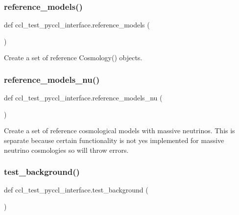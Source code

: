 \subsubsection{\texorpdfstring{reference\+\_\+models()}{reference\_models()}}
{\footnotesize\ttfamily def ccl\+\_\+test\+\_\+pyccl\+\_\+interface.\+reference\+\_\+models (\begin{DoxyParamCaption}{ }\end{DoxyParamCaption})}

\begin{DoxyVerb}Create a set of reference Cosmology() objects.
\end{DoxyVerb}
 \mbox{\label{namespaceccl__test__pyccl__interface_a2d1bcf258dbc29d3e39ce74e3dff711e}} 
\subsubsection{\texorpdfstring{reference\+\_\+models\+\_\+nu()}{reference\_models\_nu()}}
{\footnotesize\ttfamily def ccl\+\_\+test\+\_\+pyccl\+\_\+interface.\+reference\+\_\+models\+\_\+nu (\begin{DoxyParamCaption}{ }\end{DoxyParamCaption})}

\begin{DoxyVerb}Create a set of reference cosmological models with massive neutrinos.
This is separate because certain functionality is not yes implemented
for massive neutrino cosmologies so will throw errors.
\end{DoxyVerb}
 \mbox{\label{namespaceccl__test__pyccl__interface_ac8e0f5304f7823f08dd48bd16736cbde}} 
\subsubsection{\texorpdfstring{test\+\_\+background()}{test\_background()}}
{\footnotesize\ttfamily def ccl\+\_\+test\+\_\+pyccl\+\_\+interface.\+test\+\_\+background (\begin{DoxyParamCaption}{ }\end{DoxyParamCaption})}

